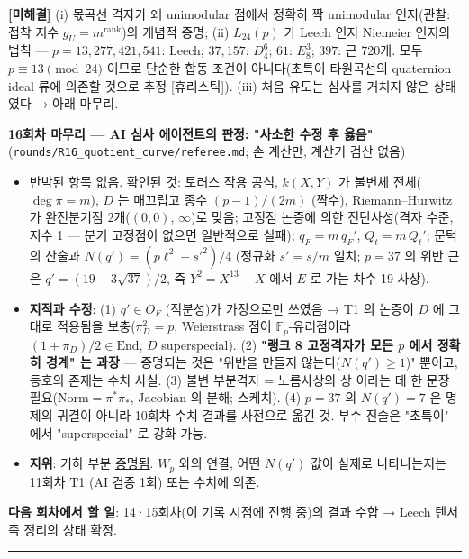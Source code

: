 \textbf{{[}미해결{]}} (i) 몫곡선 격자가 왜 unimodular 점에서 정확히 짝 unimodular 인지(관찰: 접착 지수 \(g_U=m^{\mathrm{rank}}\))의 개념적 증명; (ii) \(L_{24}(p)\) 가 Leech 인지 Niemeier 인지의 법칙 --- \(p=13,277,421,541\): Leech; \(37,157\): \(D_4^6\); \(61\): \(E_8^3\); \(397\): 근 720개. 모두 \(p\equiv13\pmod{24}\) 이므로 단순한 합동 조건이 아니다(초특이 타원곡선의 quaternion ideal 류에 의존할 것으로 추정 {[}휴리스틱{]}). (iii) 처음 유도는 심사를 거치지 않은 상태였다 → 아래 마무리.

\textbf{16회차 마무리 --- AI 심사 에이전트의 판정: "사소한 수정 후 옳음"} (\texttt{rounds/R16\_quotient\_curve/referee.md}; 손 계산만, 계산기 검산 없음)

\begin{itemize}
\tightlist
\item
  반박된 항목 없음. 확인된 것: 토러스 작용 공식, \(k(X,Y)\) 가 불변체 전체(\(\deg\pi=m\)), \(D\) 는 매끄럽고 종수 \((p-1)/(2m)\) (짝수), Riemann--Hurwitz 가 완전분기점 2개(\((0,0)\), \(\infty\))로 맞음; 고정점 논증에 의한 전단사성(격자 수준, 지수 1 --- 분기 고정점이 없으면 일반적으로 실패); \(q_F=m\,q_F'\), \(Q_t=m\,Q_t'\); 문턱의 산술과 \(N(q')=(p\ell^2-s'^2)/4\) (정규화 \(s'=s/m\) 일치; \(p=37\) 의 위반 근은 \(q'=(19-3\sqrt{37})/2\), 즉 \(Y^2=X^{13}-X\) 에서 \(E\) 로 가는 차수 19 사상).
\item
  \textbf{지적과 수정}: (1) \(q'\in O_F\) (적분성)가 가정으로만 쓰였음 → T1 의 논증이 \(D\) 에 그대로 적용됨을 보충(\(\pi_D^2=p\), Weierstrass 점이 \(\mathbb F_p\)-유리점이라 \((1+\pi_D)/2\in\mathrm{End}\), \(D\) superspecial). (2) \textbf{"랭크 8 고정격자가 모든 \(p\) 에서 정확히 경계" 는 과장} --- 증명되는 것은 "위반을 만들지 않는다(\(N(q')\ge1\))" 뿐이고, 등호의 존재는 수치 사실. (3) 불변 부분격자 = 노름사상의 상 이라는 데 한 문장 필요(\(\mathrm{Norm}=\pi^*\pi_*\), Jacobian 의 분해; 스케치). (4) \(p=37\) 의 \(N(q')=7\) 은 명제의 귀결이 아니라 10회차 수치 결과를 사전으로 옮긴 것. 부수 진술은 "초특이" 에서 "superspecial" 로 강화 가능.
\item
  \textbf{지위}: 기하 부분 \href{AI\%20심사\%201회}{증명됨}. \(W_p\) 와의 연결, 어떤 \(N(q')\) 값이 실제로 나타나는지는 11회차 T1 (AI 검증 1회) 또는 수치에 의존.
\end{itemize}

\textbf{다음 회차에서 할 일}: 14·15회차(이 기록 시점에 진행 중)의 결과 수합 → Leech 텐서족 정리의 상태 확정.

\begin{center}\rule{0.5\linewidth}{0.5pt}\end{center}

